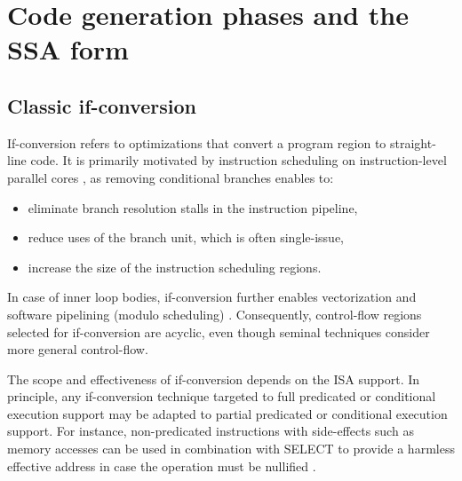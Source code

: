 \section{Code generation phases and the SSA form}
\label{sec:ssa-codegen-suitability}

\begin{comment}

\subsection{Instruction selection}

Instruction selection (Chapter~\ref{chapter:code_selection}). Unlike
classic techniques that match one IR tree or one DAG at a time, using the SSA
form as input extends the scope of pattern matching to more complex IR graphs,
in particular those resulting from control-flow constructs.

\end{comment}

\subsection{Classic if-conversion}


If-conversion refers to optimizations that convert a program region to
straight-line code.  It is primarily motivated by instruction scheduling on
instruction-level parallel cores \cite{Mahlke:1995:ISCA}, as removing
conditional branches enables to: \begin{itemize}
\item eliminate branch resolution stalls in the instruction pipeline,
\item reduce uses of the branch unit, which is often single-issue,
\item increase the size of the instruction scheduling regions.
\end{itemize} In case of inner loop bodies, if-conversion further enables
vectorization \cite{Allen:1983:POPL} and software pipelining (modulo scheduling)
\cite{Park:1991:TR58}. Consequently, control-flow regions selected for
if-conversion are acyclic, even though seminal techniques
\cite{Allen:1983:POPL,Park:1991:TR58} consider more general control-flow.

The scope and effectiveness of if-conversion depends on the ISA support.  In
principle, any if-conversion technique targeted to full predicated or
conditional execution support may be adapted to partial predicated or
conditional execution support.  For instance, non-predicated instructions with
side-effects such as memory accesses can be used in combination with SELECT to
provide a harmless effective address in case the operation must be nullified
\cite{Mahlke:1995:ISCA}.

